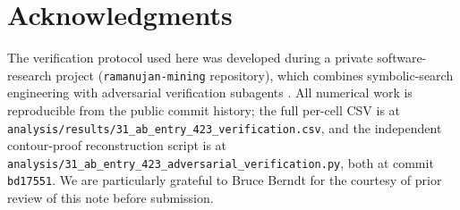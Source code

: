 \documentclass[11pt,reqno]{amsart}
\theoremstyle{definition}
\begin{document}
\section*{Acknowledgments}

The verification protocol used here was developed during a private
software-research project (\texttt{ramanujan-mining} repository),
which combines symbolic-search engineering with adversarial
verification subagents \cite{ProjectC}. All numerical work is
reproducible from the public commit history; the full per-cell CSV
is at \verb|analysis/results/31_ab_entry_423_verification.csv|, and
the independent contour-proof reconstruction script is at
\verb|analysis/31_ab_entry_423_adversarial_verification.py|, both at
commit \texttt{bd17551}. We are particularly grateful to Bruce
Berndt for the courtesy of prior review of this note before
submission.



\end{document}
